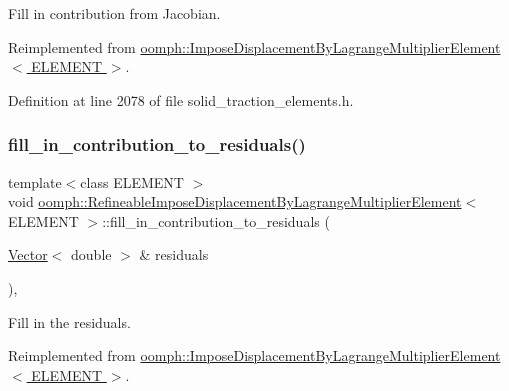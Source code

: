 Fill in contribution from Jacobian. 



Reimplemented from \hyperlink{classoomph_1_1ImposeDisplacementByLagrangeMultiplierElement_a8f196eaf084264031cf36fb541978123}{oomph\+::\+Impose\+Displacement\+By\+Lagrange\+Multiplier\+Element$<$ E\+L\+E\+M\+E\+N\+T $>$}.



Definition at line 2078 of file solid\+\_\+traction\+\_\+elements.\+h.

\mbox{\label{classoomph_1_1RefineableImposeDisplacementByLagrangeMultiplierElement_a31ed3e9bd0d168fb2278add70062dac2}} 
\subsubsection{\texorpdfstring{fill\+\_\+in\+\_\+contribution\+\_\+to\+\_\+residuals()}{fill\_in\_contribution\_to\_residuals()}}
{\footnotesize\ttfamily template$<$class E\+L\+E\+M\+E\+NT $>$ \\
void \hyperlink{classoomph_1_1RefineableImposeDisplacementByLagrangeMultiplierElement}{oomph\+::\+Refineable\+Impose\+Displacement\+By\+Lagrange\+Multiplier\+Element}$<$ E\+L\+E\+M\+E\+NT $>$\+::fill\+\_\+in\+\_\+contribution\+\_\+to\+\_\+residuals (\begin{DoxyParamCaption}\item[{\hyperlink{classoomph_1_1Vector}{Vector}$<$ double $>$ \&}]{residuals }\end{DoxyParamCaption})\hspace{0.3cm}{\ttfamily [inline]}, {\ttfamily [virtual]}}



Fill in the residuals. 



Reimplemented from \hyperlink{classoomph_1_1ImposeDisplacementByLagrangeMultiplierElement_a1c65bc4013288cba24313e4cd1339919}{oomph\+::\+Impose\+Displacement\+By\+Lagrange\+Multiplier\+Element$<$ E\+L\+E\+M\+E\+N\+T $>$}.



